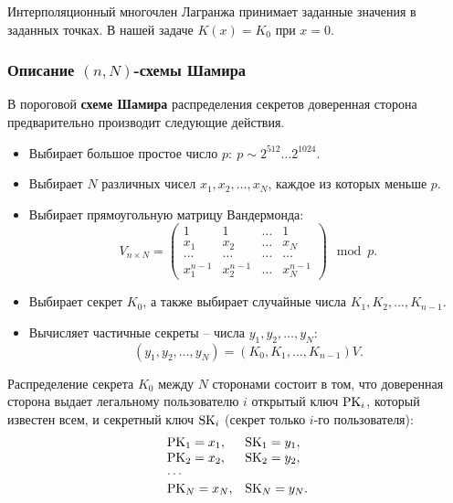 Интерполяционный многочлен Лагранжа принимает заданные значения в заданных точках. В нашей задаче $K(x)=K_{0}$ при $x=0$.


\subsubsection{Описание $(n, N)$-схемы Шамира}

В пороговой \textbf{схеме Шамира} распределения секретов доверенная сторона предварительно производит следующие действия.
\begin{itemize}
    \item Выбирает большое простое число $p: ~ p \sim 2^{512} \dots 2^{1024}$.
    \item Выбирает $N$ различных чисел $x_1, x_2, \dots, x_N$, каждое из которых меньше $p$.
    \item Выбирает прямоугольную матрицу Вандермонда:
        \[
            V_{n \times N} = \left( \begin{array}{cccc}
                {1} & {1} & { \ldots } & {1} \\
                {x_{1} } & {x_{2} } & { \ldots } & {x_{N} } \\
                { \ldots } & { \ldots } & { \ldots } & { \ldots } \\
                {x_{1}^{n-1} } & {x_{2}^{n-1} } & { \ldots } & {x_{N}^{n-1} }
            \end{array} \right) \mod p.
        \]
    \item Выбирает секрет $K_0$, а также выбирает случайные числа $K_1, K_2, \dots, K_{n-1}$.
    \item Вычисляет частичные секреты -- числа $y_1, y_2, \dots, y_N$:
        \[ (y_1, y_2, \dots, y_N) = (K_0, K_1, \dots, K_{n-1}) V. \]
\end{itemize}

Распределение секрета $K_0$ между $N$ сторонами состоит в том, что доверенная сторона выдает легальному пользователю $i$  открытый ключ $\textrm{PK}_i$, который известен всем, и секретный ключ $\textrm{SK}_i$ (секрет только $i$-го пользователя):
\[ \begin{array}{ll}
    \textrm{PK}_1 = x_1, & \textrm{SK}_1 = y_1, \\
    \textrm{PK}_2 = x_2, & \textrm{SK}_2 = y_2, \\
    \cdots & \\
    \textrm{PK}_N = x_N, & \textrm{SK}_N = y_N. \\
\end{array} \]


